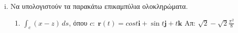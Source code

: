 



\everymath{\displaystyle}




 \begin{center}
 \end{center}


 \vspace{\baselineskip}


 \begin{enumerate}[i)]
     \item Να υπολογιστούν τα παρακάτω επικαμπύλια ολοκληρώματα.
         \begin{enumerate}
             \item $ \int_{c} (x-z) \,{ds}  $, \quad όπου $ c:\; \mathbf{r}(t) = cost \mathbf{i}+
                 \sin{t} \mathbf{j}+ t \mathbf{k} $ \hfill Απ: $ \sqrt{2} - \sqrt{2}
                 \frac{\pi ^{2}}{8} $  
         \end{enumerate}
 \end{enumerate}




